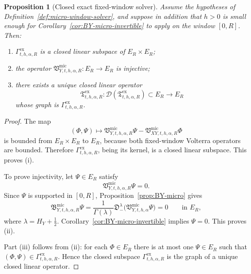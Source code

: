 \documentclass[11pt,a4paper]{amsart}
\theoremstyle{plain}
\newtheorem{proposition}[theorem]{Proposition}
\theoremstyle{definition}
\theoremstyle{remark}
\begin{document}
\begin{proposition}[Closed exact fixed-window solver]
\label{prop:micro-window-solver}
Assume the hypotheses of Definition~\ref{def:micro-window-solver}, and suppose in addition that
\(h>0\) is small enough for Corollary~\ref{cor:BY-micro-invertible} to apply on the window
\([0,R]\). Then:
\begin{enumerate}[label=(\roman*)]
\item \(\Gamma_{t,h,\alpha,R}^{\mathrm{ex}}\) is a closed linear subspace of \(E_R\times E_R\);
\item the operator \(\mathfrak V_{Y,t,h,\alpha,R}^{\mathrm{mic}}:E_R\to E_R\) is injective;
\item there exists a unique closed linear operator
\[
\mathfrak T_{t,h,\alpha,R}^{\mathrm{ex}}:
\mathcal D(\mathfrak T_{t,h,\alpha,R}^{\mathrm{ex}})\subset E_R\to E_R
\]
whose graph is \(\Gamma_{t,h,\alpha,R}^{\mathrm{ex}}\).
\end{enumerate}
\end{proposition}

\begin{proof}
The map
\[
(\Phi,\Psi)\longmapsto
\mathfrak V_{Y,t,h,\alpha,R}^{\mathrm{mic}}\Psi
-
\mathfrak V_{XY,t,h,\alpha,R}^{\mathrm{mic}}\Phi
\]
is bounded from \(E_R\times E_R\) to \(E_R\), because both fixed-window Volterra operators are
bounded. Therefore \(\Gamma_{t,h,\alpha,R}^{\mathrm{ex}}\), being its kernel, is a closed linear
subspace. This proves (i).

To prove injectivity, let \(\Psi\in E_R\) satisfy
\[
\mathfrak V_{Y,t,h,\alpha,R}^{\mathrm{mic}}\Psi=0.
\]
Since \(\Psi\) is supported in \([0,R]\), Proposition~\ref{prop:BY-micro} gives
\[
\mathfrak B_{Y,t,h,\alpha,R}^{\mathrm{mic}}\Psi
=
\frac{1}{\Gamma(\lambda)}
\mathfrak D_-^\lambda
\bigl(
\mathfrak V_{Y,t,h,\alpha}^{\mathrm{mic}}\Psi
\bigr)
=
0
\qquad\text{in }E_R,
\]
where \(\lambda=H_Y+\frac12\). Corollary~\ref{cor:BY-micro-invertible} implies
\(\Psi=0\). This proves (ii).

Part (iii) follows from (ii): for each \(\Phi\in E_R\) there is at most one
\(\Psi\in E_R\) such that \((\Phi,\Psi)\in\Gamma_{t,h,\alpha,R}^{\mathrm{ex}}\). Hence the closed
subspace \(\Gamma_{t,h,\alpha,R}^{\mathrm{ex}}\) is the graph of a unique closed linear operator.
\end{proof}
\end{document}
